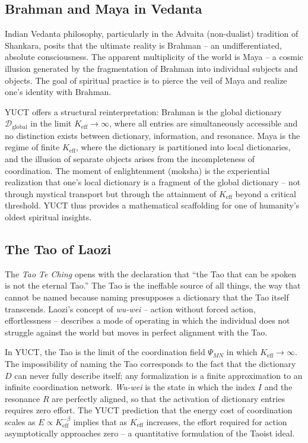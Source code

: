 \documentclass[12pt,a4paper]{article}
\begin{document}
	\subsection{Brahman and Maya in Vedanta}
	
	Indian Vedanta philosophy, particularly in the Advaita (non-dualist) tradition of Shankara, posits that the ultimate reality is Brahman -- an undifferentiated, absolute consciousness. The apparent multiplicity of the world is Maya -- a cosmic illusion generated by the fragmentation of Brahman into individual subjects and objects. The goal of spiritual practice is to pierce the veil of Maya and realize one's identity with Brahman.
	
	YUCT offers a structural reinterpretation: Brahman is the global dictionary \(\mathcal{D}_{\text{global}}\) in the limit \(K_{\mathrm{eff}} \to \infty\), where all entries are simultaneously accessible and no distinction exists between dictionary, information, and resonance. Maya is the regime of finite \(K_{\mathrm{eff}}\), where the dictionary is partitioned into local dictionaries, and the illusion of separate objects arises from the incompleteness of coordination. The moment of enlightenment (moksha) is the experiential realization that one's local dictionary is a fragment of the global dictionary -- not through mystical transport but through the attainment of \(K_{\mathrm{eff}}\) beyond a critical threshold. YUCT thus provides a mathematical scaffolding for one of humanity's oldest spiritual insights.
	
	\subsection{The Tao of Laozi}
	
	The \emph{Tao Te Ching} opens with the declaration that ``the Tao that can be spoken is not the eternal Tao.'' The Tao is the ineffable source of all things, the way that cannot be named because naming presupposes a dictionary that the Tao itself transcends. Laozi's concept of \emph{wu-wei} -- action without forced action, effortlessness -- describes a mode of operating in which the individual does not struggle against the world but moves in perfect alignment with the Tao.
	
	In YUCT, the Tao is the limit of the coordination field \(\Psi_{MN}\) in which \(K_{\mathrm{eff}} \to \infty\). The impossibility of naming the Tao corresponds to the fact that the dictionary \(D\) can never fully describe itself; any formalization is a finite approximation to an infinite coordination network. \emph{Wu-wei} is the state in which the index \(I\) and the resonance \(R\) are perfectly aligned, so that the activation of dictionary entries requires zero effort. The YUCT prediction that the energy cost of coordination scales as \(E \propto K_{\mathrm{eff}}^{-\beta}\) implies that as \(K_{\mathrm{eff}}\) increases, the effort required for action asymptotically approaches zero -- a quantitative formulation of the Taoist ideal.
	
\end{document}

